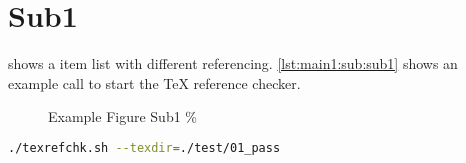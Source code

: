 \section[Sub1]{Sub1}\label{main1:sub:sub1}

 shows a item list with different referencing. \autoref{lst:main1:sub:sub1} shows an example call to start the TeX reference checker.


\begin{figure}[!h]
    \caption[{Main1; Sub; Sub1}]{Example Figure Sub1 \%}\label{fig:main1:sub:sub1}  %
\end{figure}


\begin{lstlisting}[language=bash,caption={Start texrefchk}, label=lst:main1:sub:sub1]
./texrefchk.sh --texdir=./test/01_pass
\end{lstlisting}


%
%
%

